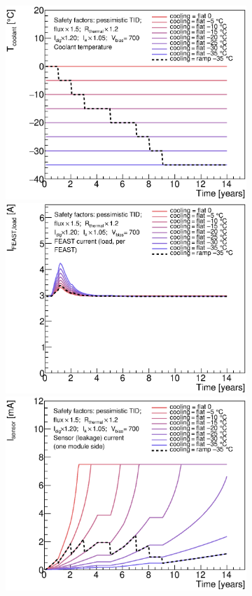 \begin{figure}[ht!]
\begin{subfigure}[t]{0.50\textwidth}
\begin{center}
\includegraphics[width=0.74\linewidth]{figures/studies/CoolantTemperature_CompareR1_Ramp.eps}
\includegraphics[width=0.74\linewidth]{figures/studies/FeastCurrent_CompareR1_Ramp.eps}
\includegraphics[width=0.74\linewidth]{figures/studies/SensorCurrent_CompareR1_Ramp.eps}

\end{center}
\end{subfigure}
\end{figure}
